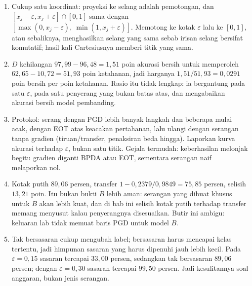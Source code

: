 \begin{enumerate}[label=\textbf{29.\arabic*}]
  \item Cukup satu koordinat: proyeksi ke selang adalah pemotongan, dan
        $[x_{j}-\varepsilon,x_{j}+\varepsilon]\cap[0,1]$ sama dengan
        $[\max(0,x_{j}-\varepsilon),\ \min(1,x_{j}+\varepsilon)]$. Memotong ke kotak
        $\varepsilon$ lalu ke $[0,1]$, atau sebaliknya, menghasilkan selang yang
        sama sebab irisan selang bersifat komutatif; hasil kali Cartesiusnya memberi
        titik yang sama.

  \item $D$ kehilangan $97{,}99-96{,}48=1{,}51$ poin akurasi bersih untuk
        memperoleh $62{,}65-10{,}72=51{,}93$ poin ketahanan, jadi harganya
        $1{,}51/51{,}93=0{,}0291$ poin bersih per poin ketahanan. Rasio itu tidak
        lengkap: ia bergantung pada satu $\varepsilon$, pada satu penyerang yang
        bukan batas atas, dan mengabaikan akurasi bersih model pembanding.

  \item Protokol: serang dengan PGD lebih banyak langkah dan beberapa mulai acak,
        dengan EOT atas keacakan pertahanan, lalu ulangi dengan serangan tanpa
        gradien (tiruan/transfer, penaksiran beda hingga). Laporkan kurva akurasi
        terhadap $\varepsilon$, bukan satu titik. Gejala termudah: keberhasilan
        melonjak begitu gradien diganti BPDA atau EOT, sementara serangan naif
        melaporkan nol.

  \item Kotak putih $89{,}06$ persen, transfer $1-0{,}2379/0{,}9849=75{,}85$
        persen, selisih $13{,}21$ poin. Itu bukan bukti $B$ lebih aman: serangan
        yang dibuat khusus untuk $B$ akan lebih kuat, dan di bab ini selisih kotak
        putih terhadap transfer memang menyusut kalau penyerangnya disesuaikan.
        Butir ini ambigu: keluaran lab tidak memuat baris PGD untuk model $B$.

  \item Tak bersasaran cukup mengubah label; bersasaran harus mencapai kelas
        tertentu, jadi himpunan sasaran yang harus dipenuhi jauh lebih kecil. Pada
        $\varepsilon=0{,}15$ sasaran tercapai $33{,}00$ persen, sedangkan tak
        bersasaran $89{,}06$ persen; dengan $\varepsilon=0{,}30$ sasaran tercapai
        $99{,}50$ persen. Jadi kesulitannya soal anggaran, bukan jenis serangan.
\end{enumerate}

